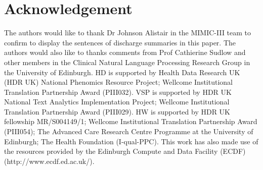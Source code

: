 \documentclass[final,5p,times,twocolumn]{elsarticle}
\begin{document}
\section*{Acknowledgement}
The authors would like to thank Dr Johnson Alistair in the MIMIC-III team to confirm to display the sentences of discharge summaries in this paper. The authors would also like to thanks comments from Prof Cathierine Sudlow and other members in the Clinical Natural Language Processing Research Group in the University of Edinburgh. HD is supported by Health Data Research UK (HDR UK) National Phenomics Resource Project; Wellcome Institutional Translation Partnership Award (PIII032). VSP is supported by HDR UK National Text Analytics Implementation Project; Wellcome Institutional Translation Partnership Award (PIII029). HW is supported by HDR UK fellowship MR/S004149/1; Wellcome Institutional Translation Partnership Award (PIII054); The Advanced Care Research Centre Programme at the University of Edinburgh; The Health Foundation (I-qual-PPC). This work has also made use of the resources provided by the Edinburgh Compute and Data Facility (ECDF) (http://www.ecdf.ed.ac.uk/).



\end{document}
